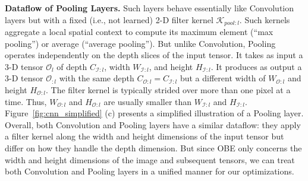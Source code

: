 
\vspace{2mm}
\noindent \textbf{Dataflow of Pooling Layers.} 
Such layers behave essentially like Convolution layers but with a fixed (i.e., not learned) 2-D filter kernel $\mathcal{K}_{pool:l}$. Such kernels aggregate a local spatial context to compute its maximum element (``max pooling'') or average (``average pooling''). But unlike Convolution, Pooling operates independently on the depth slices of the input tensor.
It takes as input a 3-D tensor $\mathcal{O}_{l}$ of depth $C_{\mathcal{I}:l}$, width $W_{\mathcal{I}:l}$, and height $H_{\mathcal{I}:l}$. It produces as output a 3-D tensor $\mathcal{O}_{:l}$ with the same depth $C_{\mathcal{O}:l}=C_{\mathcal{I}:l}$ but a different width of $W_{\mathcal{O}:l}$ and height $H_{\mathcal{O}:l}$. The filter kernel is typically strided over more than one pixel at a time. Thus, $W_{\mathcal{O}:l}$ and $H_{\mathcal{O}:l}$ are usually smaller than $W_{\mathcal{I}:l}$ and $H_{\mathcal{I}:l}$. Figure~\ref{fig:cnn_simplified} (c) presents a simplified illustration of a Pooling layer.
Overall, both Convolution and Pooling layers have a similar dataflow: they apply a filter kernel along the width and height dimensions of the input tensor but differ on how they handle the depth dimension. But since OBE only concerns the width and height dimensions of the image and subsequent tensors, we can treat both Convolution and Pooling layers in a unified manner for our optimizations.



